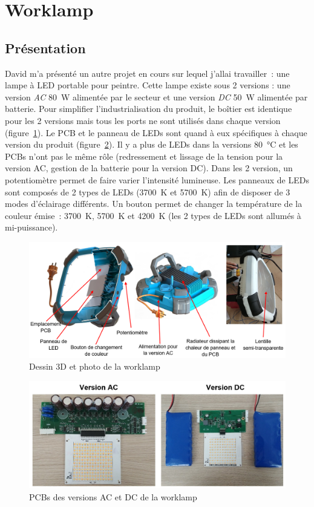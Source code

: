 \documentclass[a4paper, 12pt, sffamily]{report}
\begin{document}
\section{Worklamp}
\subsection{Présentation}
David m’a présenté un autre projet en cours sur lequel j'allai travailler~: une lampe à LED portable pour peintre. Cette lampe existe sous 2 versions : une version \emph{AC} \SI{80}{\watt} alimentée par le secteur et une version \emph{DC} \SI{50}{\watt} alimentée par batterie. Pour simplifier l'industrialisation du produit, le boîtier est identique pour les 2 versions mais tous les ports ne sont utilisés dans chaque version (figure~\ref{fig:captioned_worklamp}). Le PCB et le panneau de LEDs sont quand à eux spécifiques à chaque version du produit (figure~\ref{fig:worklamp_PCBs}). Il y a plus de LEDs dans la versions \SI{80}{\celsius} et les PCBs n'ont pas le même rôle (redressement et lissage de la tension pour la version AC, gestion de la batterie pour la version DC).
Dans les 2 version, un potentiomètre permet de faire varier l'intensité lumineuse. Les panneaux de LEDs sont composés de 2 types de LEDs (\SI{3700}{\kelvin} et \SI{5700}{\kelvin}) afin de disposer de 3 modes d’éclairage différents. Un bouton permet de changer la température de la couleur émise~: \SI{3700}{\kelvin}, \SI{5700}{\kelvin} et \SI{4200}{\kelvin} (les 2 types de LEDs sont allumés à mi-puissance). 

\begin{figure}[H]
\centering
\includegraphics[scale=0.45]{figures/screenshots/captioned_worklamp.png}
\caption{Dessin 3D et photo de la worklamp}
\label{fig:captioned_worklamp}
\end{figure}

\begin{figure}[H]
\centering
\includegraphics[scale=0.43]{figures/photos/worklamp_PCBs.jpg}
\caption{PCBs des versions AC et DC de la worklamp}
\label{fig:worklamp_PCBs}
\end{figure}
\end{document}
